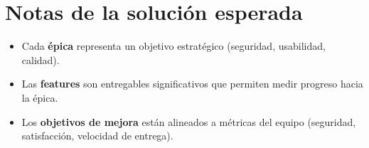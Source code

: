 \documentclass[11pt]{article}
\begin{document}
\section*{Notas de la solución esperada}
\begin{itemize}
  \item Cada \textbf{épica} representa un objetivo estratégico (seguridad, usabilidad, calidad).
  \item Las \textbf{features} son entregables significativos que permiten medir progreso hacia la épica.
  \item Los \textbf{objetivos de mejora} están alineados a métricas del equipo (seguridad, satisfacción, velocidad de entrega).
\end{itemize}
\end{document}
